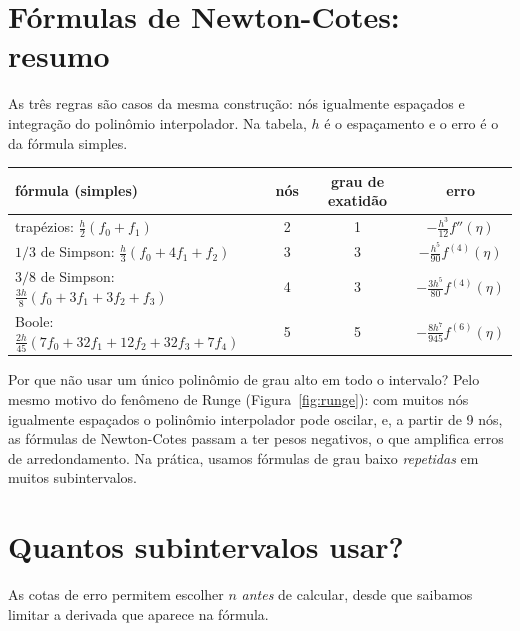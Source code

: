 \section{Fórmulas de Newton-Cotes: resumo}

As três regras são casos da mesma construção: nós igualmente espaçados e integração do
polinômio interpolador. Na tabela, $h$ é o espaçamento e o erro é o da fórmula simples.

\begin{center}
\renewcommand{\arraystretch}{1.55}
\begin{tabular}{l|c|c|c}
fórmula (simples) & nós & grau de exatidão & erro\\ \hline
trapézios: $\frac h2(f_0+f_1)$ & 2 & 1 & $-\frac{h^3}{12}f''(\eta)$\\
$1/3$ de Simpson: $\frac h3(f_0+4f_1+f_2)$ & 3 & 3 & $-\frac{h^5}{90}f^{(4)}(\eta)$\\
$3/8$ de Simpson: $\frac{3h}{8}(f_0+3f_1+3f_2+f_3)$ & 4 & 3 & $-\frac{3h^5}{80}f^{(4)}(\eta)$\\
Boole: $\frac{2h}{45}(7f_0+32f_1+12f_2+32f_3+7f_4)$ & 5 & 5 & $-\frac{8h^7}{945}f^{(6)}(\eta)$
\end{tabular}
\end{center}

\begin{observacao}
Por que não usar um único polinômio de grau alto em todo o intervalo? Pelo mesmo motivo do
fenômeno de Runge (Figura~\ref{fig:runge}): com muitos nós igualmente espaçados o polinômio
interpolador pode oscilar, e, a partir de 9 nós, as fórmulas de Newton-Cotes passam a ter
pesos negativos, o que amplifica erros de arredondamento. Na prática, usamos fórmulas de
grau baixo \emph{repetidas} em muitos subintervalos.
\end{observacao}

\section{Quantos subintervalos usar?}

As cotas de erro permitem escolher $n$ \emph{antes} de calcular, desde que saibamos
limitar a derivada que aparece na fórmula.

